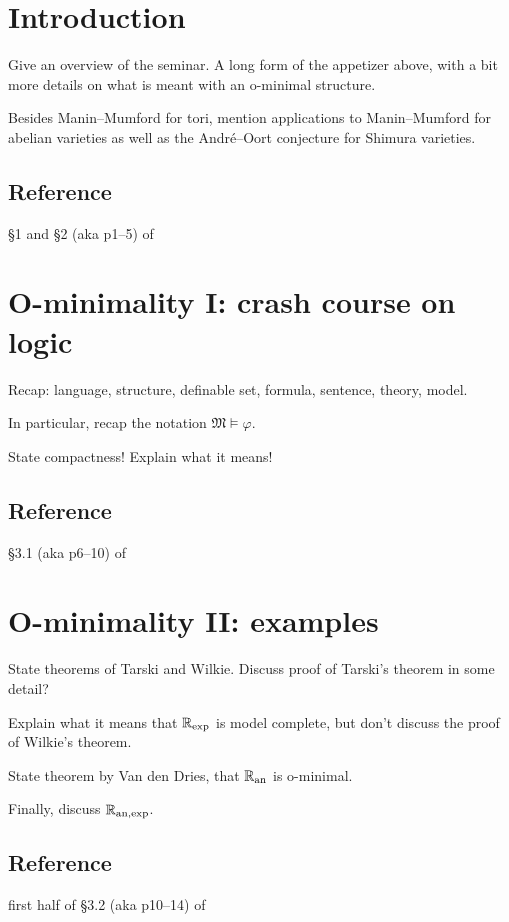 \documentclass[10pt, a4paper]{amsart}
\def\phi{\varphi}
\begin{document}
\section{Introduction}

Give an overview of the seminar.
A long form of the appetizer above,
with a bit more details on what is meant with an o-minimal structure.

Besides Manin--Mumford for tori,
mention applications to Manin--Mumford for abelian varieties
as well as the Andr\'e--Oort conjecture for Shimura varieties.

\subsection*{Reference} \S1 and \S2 (aka p1--5) of~\cite{scanlon}

\section{O-minimality I: crash course on logic}

Recap: language, structure, definable set, formula, sentence, theory, model.

In particular, recap the notation $\mathfrak M \models \phi$.

State compactness! Explain what it means!

\subsection*{Reference} \S3.1 (aka p6--10) of~\cite{scanlon}

\section{O-minimality II: examples}

State theorems of Tarski and Wilkie.
Discuss proof of Tarski's theorem in some detail?

Explain what it means that $\mathbb{R}_{\exp}$ is model complete,
but don't discuss the proof of Wilkie's theorem.

State theorem by Van den Dries, that $\mathbb{R}_{\mathrm{an}}$ is o-minimal.

Finally, discuss $\mathbb{R}_{\mathrm{an},\exp}$.

\subsection*{Reference} first half of \S3.2 (aka p10--14) of~\cite{scanlon}
\end{document}
